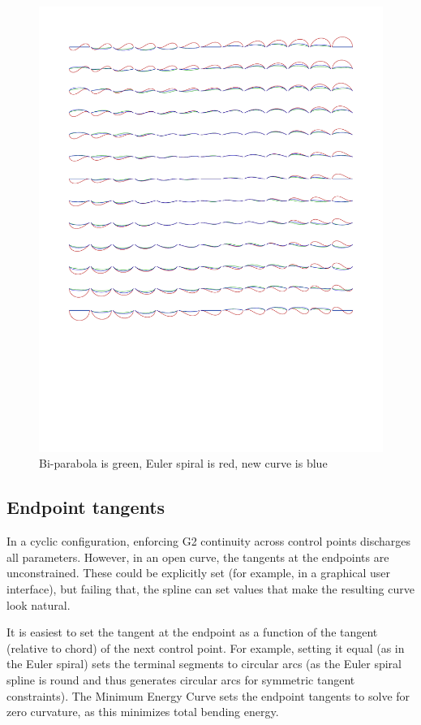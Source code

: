 \documentclass{article}
\begin{document}
\begin{figure}
\includegraphics[scale=0.7]{biparab_euler_mycurve}
\caption{Bi-parabola is green, Euler spiral is red, new curve is blue}
\end{figure}

\subsection{Endpoint tangents}

In a cyclic configuration, enforcing G2 continuity across control points discharges all parameters. However, in an open curve, the tangents at the endpoints are unconstrained. These could be explicitly set (for example, in a graphical user interface), but failing that, the spline can set values that make the resulting curve look natural.

It is easiest to set the tangent at the endpoint as a function of the tangent (relative to chord) of the next control point. For example, setting it equal (as in the Euler spiral) sets the terminal segments to circular arcs (as the Euler spiral spline is round and thus generates circular arcs for symmetric tangent constraints). The Minimum Energy Curve sets the endpoint tangents to solve for zero curvature, as this minimizes total bending energy.
\end{document}
